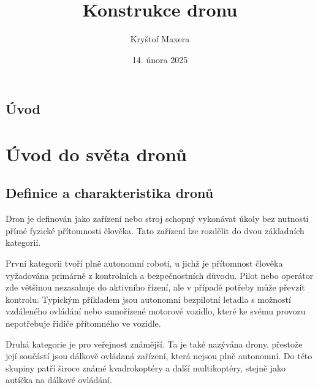 \documentclass[12pt]{report}
\author{Kryštof Maxera}                  %
\title{Konstrukce dronu}    %
\date{14. února 2025}                 %
\begin{document}
	\mytitlepage						%
	
	
	\abstrakt{
		\lipsum[1]						%
	}{
		\lipsum[1]						%
	}
	
	\podekovani{
		\lipsum[2]						%
	}
	
   {\tableofcontents\newpage}			%
	
\addtocounter{page}{1}		%
\chapter*{Úvod}     %
	
\lipsum[1]	
	
\part{Úvod do světa dronů}  %
	
\chapter[Definice a charakteristika dronů]{Definice a charakteristika dronů}

Dron je definován jako zařízení nebo stroj schopný vykonávat úkoly bez nutnosti přímé fyzické přítomnosti člověka. Tato zařízení lze rozdělit do dvou základních kategorií.

První kategorii tvoří plně autonomní roboti, u jichž je přítomnost člověka vyžadována primárně z kontrolních a bezpečnostních důvodu. Pilot nebo operátor zde většinou nezasahuje do aktivního řízení, ale v případě potřeby může převzít kontrolu. Typickým příkladem jsou autonomní bezpilotní letadla s možností vzdáleného ovládání nebo samořízené motorové vozidlo, které ke svému provozu nepotřebuje řidiče přítomného ve vozidle.

Druhá kategorie je pro veřejnost známější. Ta je také nazývána drony, přestože její součástí jsou dálkově ovládaná zařízení, která nejsou plně autonomní. Do této skupiny patří široce známé kvadrokoptéry a další multikoptéry, stejně jako autíčka na dálkové ovládání.
\end{document}

